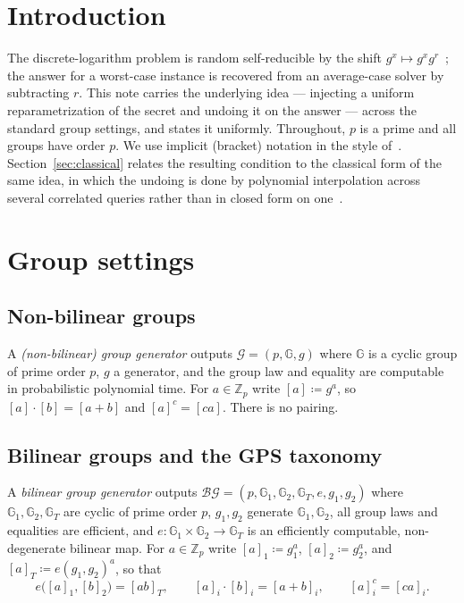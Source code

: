 \documentclass{aicr-solution}
\newcommand{\G}{\mathbb{G}}
\newcommand{\Gone}{\mathbb{G}_1}
\newcommand{\Gtwo}{\mathbb{G}_2}
\newcommand{\GT}{\mathbb{G}_T}
\newcommand{\Zp}{\mathbb{Z}_p}
\newcommand{\bg}{\mathcal{BG}}
\begin{document}
\section{Introduction}

The discrete-logarithm problem is random self-reducible by the shift $g^{x}\mapsto
g^{x}g^{r}$~\cite{TW87}; the answer for a worst-case instance is recovered from an
average-case solver by subtracting $r$. This note carries the underlying idea --- injecting a
uniform reparametrization of the secret and undoing it on the answer --- across the standard
group settings, and states it uniformly. Throughout, $p$ is a prime and all groups have
order $p$. We use implicit (bracket) notation in the style of~\cite{EHKRV13}.
Section~\ref{sec:classical} relates the resulting condition to the classical form of the
same idea, in which the undoing is done by polynomial interpolation across several
correlated queries rather than in closed form on one~\cite{Lipton91,FF93}.

\section{Group settings}

\subsection{Non-bilinear groups}

\begin{definition}
A \emph{(non-bilinear) group generator} outputs $\mathcal G=(p,\G,g)$ where $\G$ is a
cyclic group of prime order $p$, $g$ a generator, and the group law and equality are
computable in probabilistic polynomial time. For $a\in\Zp$ write $[a]\coloneqq g^{a}$, so
$[a]\cdot[b]=[a+b]$ and $[a]^{c}=[ca]$. There is no pairing.
\end{definition}

\subsection{Bilinear groups and the GPS taxonomy}

\begin{definition}
A \emph{bilinear group generator} outputs
$\bg=(p,\Gone,\Gtwo,\GT,e,g_1,g_2)$ where $\Gone,\Gtwo,\GT$ are cyclic of prime order $p$,
$g_1,g_2$ generate $\Gone,\Gtwo$, all group laws and equalities are efficient, and
$e\colon\Gone\times\Gtwo\to\GT$ is an efficiently computable, non-degenerate bilinear map.
For $a\in\Zp$ write $[a]_1\coloneqq g_1^{a}$, $[a]_2\coloneqq g_2^{a}$, and
$[a]_T\coloneqq e(g_1,g_2)^{a}$, so that
\[
  e\bigl([a]_1,[b]_2\bigr)=[ab]_T,\qquad [a]_i\cdot[b]_i=[a+b]_i,\qquad [a]_i^{c}=[ca]_i.
\]
\end{definition}
\end{document}
